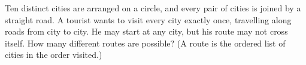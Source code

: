 Ten distinct cities are arranged on a circle, and every pair of cities is joined by a straight road. A tourist wants to visit every city exactly once, travelling along roads from city to city. He may start at any city, but his route may not cross itself. How many different routes are possible? (A route is the ordered list of cities in the order visited.)
